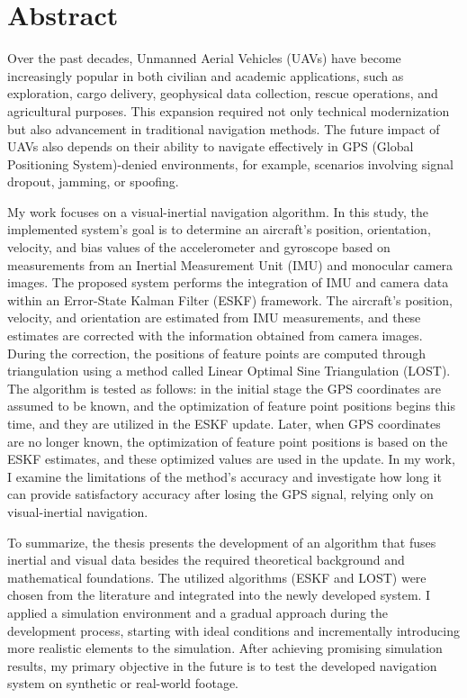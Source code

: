 \selectthesislanguage%
\chapter*{Abstract}

Over the past decades, Unmanned Aerial Vehicles (UAVs) have become increasingly popular in both civilian and academic applications, such as exploration, cargo delivery, geophysical data collection, rescue operations, and agricultural purposes. This expansion required not only technical modernization but also advancement in traditional navigation methods. The future impact of UAVs also depends on their ability to navigate effectively in GPS (Global Positioning System)-denied environments, for example, scenarios involving signal dropout, jamming, or spoofing.

My work focuses on a visual-inertial navigation algorithm. In this study, the implemented system's goal is to determine an aircraft's position, orientation, velocity, and bias values of the accelerometer and gyroscope based on measurements from an Inertial Measurement Unit (IMU) and monocular camera images. The proposed system performs the integration of IMU and camera data within an Error-State Kalman Filter (ESKF) framework. The aircraft's position, velocity, and orientation are estimated from IMU measurements, and these estimates are corrected with the information obtained from camera images. During the correction, the positions of feature points are computed through triangulation using a method called Linear Optimal Sine Triangulation (LOST). The algorithm is tested as follows: in the initial stage the GPS coordinates are assumed to be known, and the optimization of feature point positions begins this time, and they are utilized in the ESKF update. Later, when GPS coordinates are no longer known, the optimization of feature point positions is based on the ESKF estimates, and these optimized values are used in the update. In my work, I examine the limitations of the method's accuracy and investigate how long it can provide satisfactory accuracy after losing the GPS signal, relying only on visual-inertial navigation.

To summarize, the thesis presents the development of an algorithm that fuses inertial and visual data besides the required theoretical background and mathematical foundations. The utilized algorithms (ESKF and LOST) were chosen from the literature and integrated into the newly developed system. I applied a simulation environment and a gradual approach during the development process, starting with ideal conditions and incrementally introducing more realistic elements to the simulation. After achieving promising simulation results, my primary objective in the future is to test the developed navigation system on synthetic or real-world footage.